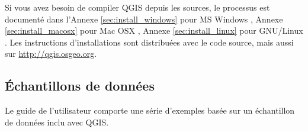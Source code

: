 Si vous avez besoin de compiler QGIS depuis les sources, le processus est documenté dans l'Annexe \ref{sec:install_windows} pour MS Windows \win, Annexe \ref{sec:install_macosx} pour Mac OSX \osx, Annexe \ref{sec:install_linux} pour GNU/Linux \nix. Les instructions d'installations sont distribuées avec le code source, mais aussi sur \url{http://qgis.osgeo.org}.

%
%
%

\subsection{Échantillons de données}\label{label_sampledata}  

Le guide de l'utilisateur comporte une série d'exemples basée sur un échantillon de données inclu avec QGIS.

